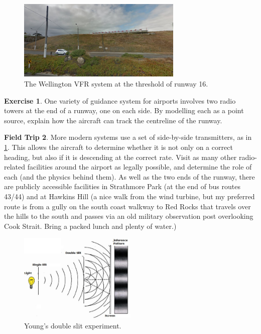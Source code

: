 \documentclass[a4paper]{amsbook}
\theoremstyle{definition}
\newtheorem{exercise}{Exercise}
\numberwithin{exercise}{chapter}
\numberwithin{exercise}{chapter}
\newtheorem{trip}[exercise]{Field Trip}
\begin{document}
\begin{figure}
  \centering
  \includegraphics[width=0.7\textwidth]{localiser}
  \caption{The Wellington VFR system at the threshold of runway 16.}\label{fig:localiser}
\end{figure}
\begin{exercise}
  One variety of guidance system for airports involves two radio towers at the end of a runway, one on each side. By modelling
  each as a point source, explain how the aircraft can track the centreline of the runway.
\end{exercise}

\begin{trip}
  More modern systems use a set of side-by-side transmitters, as in \cref{fig:localiser}. This allows the aircraft to determine whether
  it is not only on a correct heading, but also if it is descending at the correct rate. Visit as many other radio-related facilities around
  the airport as legally possible, and determine the role of each (and the physics behind them). As well as the two ends of the runway, there
  are publicly accessible facilities in Strathmore Park (at the end of bus routes 43/44) and at Hawkins Hill (a nice walk from the wind turbine,
  but my preferred route is from a gully on the south coast walkway to Red Rocks that travels over the hills to the south and passes via an old
  military observation post overlooking Cook Strait. Bring a packed lunch and plenty of water.)
\end{trip}

\begin{figure}
  \centering
  \includegraphics[width=0.5\textwidth]{doubleslit}
  \caption{Young's double slit experiment.}\label{fig:young}
\end{figure}
\end{document}

